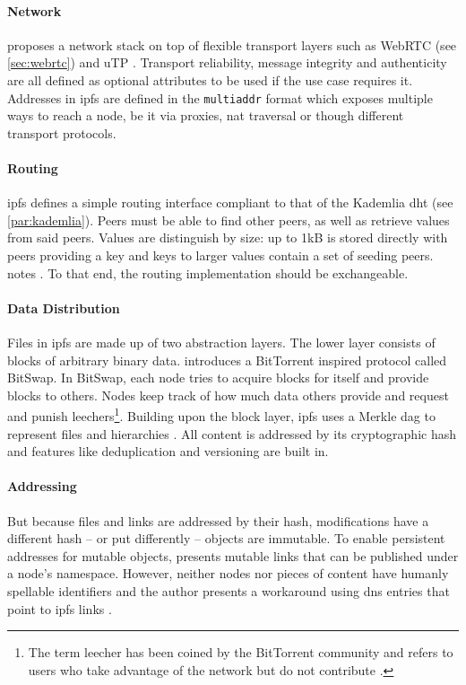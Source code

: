 \paragraph{Network}
\citet[\S3.2]{ipfs-whitepaper} proposes a network stack on top of flexible transport layers such as WebRTC (see \vref{sec:webrtc}) and uTP \cite{utp-micro-torrent-transport-protocol}. Transport reliability, message integrity and authenticity are all defined as optional attributes to be used if the use case requires it. Addresses in \gls{ipfs} are defined in the \lstinline|multiaddr| format which exposes multiple ways to reach a node, be it via proxies, \gls{nat} traversal or though different transport protocols.

\paragraph{Routing}
\gls{ipfs} defines a simple routing interface compliant to that of the Kademlia \gls{dht} (see \vref{par:kademlia}). Peers must be able to find other peers, as well as retrieve values from said peers. Values are distinguish by size: up to 1kB is stored directly with peers providing a key and keys to larger values contain a set of seeding peers. \citet[\S3.5]{ipfs-whitepaper} notes . To that end, the routing implementation should be exchangeable.

\paragraph{Data Distribution}
Files in \gls{ipfs} are made up of two abstraction layers. The lower layer consists of blocks of arbitrary binary data. \citet[\S3.4]{ipfs-whitepaper} introduces a BitTorrent inspired protocol called BitSwap. In BitSwap, each node tries to acquire blocks for itself and provide blocks to others. Nodes keep track of how much data others provide and request and punish leechers\footnote{The term leecher has been coined by the BitTorrent community and refers to users who take advantage of the network but do not contribute \cite[\S7.5]{tanenbaum_wetherall_2011}.}. Building upon the block layer, \gls{ipfs} uses a Merkle \gls{dag} to represent files and hierarchies \cite[\S3.5]{ipfs-whitepaper}. All content is addressed by its cryptographic hash \cite{content-centric-networking} and features like deduplication and versioning are built in.

\paragraph{Addressing}
But because files and links are addressed by their hash, modifications have a different hash – or put differently – objects are immutable. To enable persistent addresses for mutable objects, \citet[\S3.7]{ipfs-whitepaper} presents mutable links that can be published under a node's namespace. However, neither nodes nor pieces of content have humanly spellable identifiers and the author presents a workaround using \gls{dns} entries that point to \gls{ipfs} links \cite[\S3.7.2]{ipfs-whitepaper}.
